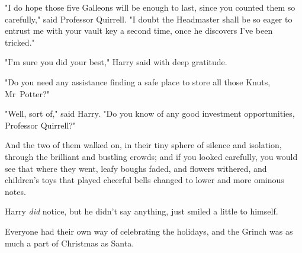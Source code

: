 "I do hope those five Galleons will be enough to last, since you counted them
so carefully," said Professor Quirrell. "I doubt the Headmaster shall be so
eager to entrust me with your vault key a second time, once he discovers I've
been tricked."

"I'm sure you did your best," Harry said with deep gratitude.

"Do you need any assistance finding a safe place to store all those Knuts,
Mr~Potter?"

"Well, sort of," said Harry. "Do you know of any good investment opportunities,
Professor Quirrell?"

And the two of them walked on, in their tiny sphere of silence and isolation,
through the brilliant and bustling crowds; and if you looked carefully, you
would see that where they went, leafy boughs faded, and flowers withered, and
children's toys that played cheerful bells changed to lower and more ominous
notes.

Harry \emph{did} notice, but he didn't say anything, just smiled a little to
himself.

Everyone had their own way of celebrating the holidays, and the Grinch was as
much a part of Christmas as Santa.
